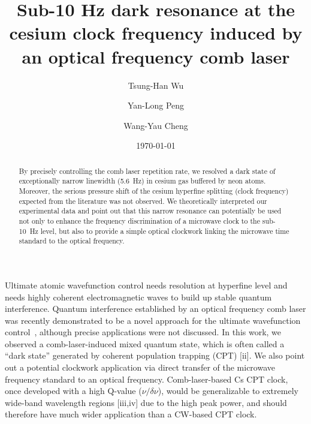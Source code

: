 \documentclass[%
reprint,  
aps,
prl,
showpacs,
]{revtex4}
\begin{document}
\title{Sub-10 Hz dark resonance at the cesium clock frequency induced by an optical frequency comb laser}

\author{Tsung-Han Wu}
\author{Yan-Long Peng}
\author{Wang-Yau Cheng}


\date{\today}

\begin{abstract}
By precisely controlling the comb laser repetition rate, we
resolved a dark state of exceptionally narrow linewidth (5.6~Hz)
in cesium gas buffered by neon atoms. Moreover, the serious
pressure shift of the cesium hyperfine splitting (clock frequency)
expected from the literature was not observed. We theoretically
interpreted our experimental data and point out that this narrow
resonance can potentially be used not only to enhance the frequency 
discrimination of a microwave clock to the sub-10~Hz level, but also to
provide a simple optical clockwork linking the microwave time standard
to the optical frequency.
\end{abstract}



\maketitle
\narrowtext
Ultimate atomic wavefunction control needs resolution at hyperfine
level and needs highly coherent electromagnetic waves to build up 
stable quantum interference. Quantum interference established by an 
optical frequency comb laser was recently demonstrated to be a novel 
approach for the ultimate wavefunction control~\cite{Stowe2008}, 
although precise applications were not discussed. In this work, 
we observed a comb-laser-induced mixed quantum state, which is 
often called a ``dark state'' generated by coherent population 
trapping (CPT) [ii]. We also point out a potential clockwork application 
via direct transfer of the microwave frequency standard to an optical 
frequency. Comb-laser-based Cs CPT clock, once developed with a high 
Q-value ($\nu/\delta\nu$), would be generalizable to extremely wide-band
wavelength regions [iii,iv] due to the high peak power, and should therefore 
have much wider application than a CW-based CPT clock.
    
\end{document}
